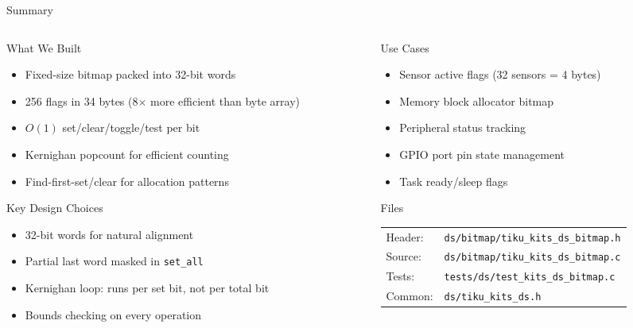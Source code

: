 \documentclass[aspectratio=169, 10pt]{beamer}
\begin{document}
\begin{frame}{Summary}
\begin{columns}[T]
\begin{column}{0.48\textwidth}
\begin{block}{What We Built}
\begin{itemize}
  \item Fixed-size bitmap packed into 32-bit words
  \item 256 flags in 34 bytes (8$\times$ more efficient than byte array)
  \item $O(1)$ set/clear/toggle/test per bit
  \item Kernighan popcount for efficient counting
  \item Find-first-set/clear for allocation patterns
\end{itemize}
\end{block}

\begin{block}{Key Design Choices}
\begin{itemize}
  \item 32-bit words for natural alignment
  \item Partial last word masked in \texttt{set\_all}
  \item Kernighan loop: runs per set bit, not per total bit
  \item Bounds checking on every operation
\end{itemize}
\end{block}
\end{column}

\begin{column}{0.48\textwidth}
\begin{block}{Use Cases}
\begin{itemize}
  \item Sensor active flags (32 sensors = 4 bytes)
  \item Memory block allocator bitmap
  \item Peripheral status tracking
  \item GPIO port pin state management
  \item Task ready/sleep flags
\end{itemize}
\end{block}

\begin{block}{Files}
\scriptsize
\begin{tabular}{@{}lp{4.5cm}@{}}
Header: & \texttt{ds/bitmap/tiku\_kits\_ds\_bitmap.h} \\
Source: & \texttt{ds/bitmap/tiku\_kits\_ds\_bitmap.c} \\
Tests: & \texttt{tests/ds/test\_kits\_ds\_bitmap.c} \\
Common: & \texttt{ds/tiku\_kits\_ds.h} \\
\end{tabular}
\end{block}
\end{column}
\end{columns}
\end{frame}
\end{document}

